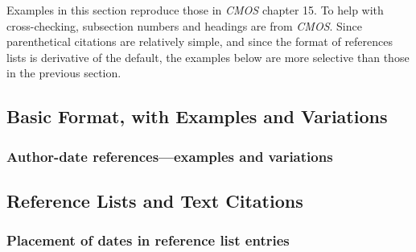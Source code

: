 \documentclass[11pt,letterpaper,oneside]{article}
\begin{document}
Examples in this section reproduce those in \textit{CMOS} chapter 15.
To help with cross-checking, subsection numbers and headings are from
\textit{CMOS}. Since parenthetical citations are relatively simple,
and since the format of references lists is derivative of the default,
the examples below are more selective than those in the previous
section.

\subsection{Basic Format, with Examples and Variations}
\setcounter{subsection}{15}

\setcounter{subsubsection}{8}
\subsubsection{Author-date references—examples and variations}
\label{15.9}

\begin{citeref}
\item \parencite[87--88]{strayed2012}
\item \parencite[32]{daum2015}
\item \parencite[188]{grazer2015}
\item \parencite[242--55]{garcia1988}
\item \parencite[310]{gould1984a}
\item \parencite[484--85]{bagley2015}
\item \parencite[312]{liu2015}
\end{citeref}

\setcounter{subsection}{1}
\subsection{Reference Lists and Text Citations}
\setcounter{subsection}{15}

\setcounter{subsubsection}{13}
\subsubsection{Placement of dates in reference list entries}
\label{15.14}

\begin{citeref}
\item \parencite{pager2015}
\item \parencite{unger2014}
\end{citeref}
\end{document}
